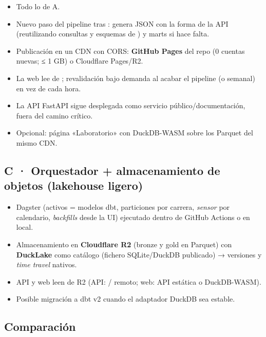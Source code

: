 \begin{itemize}
\item Todo lo de A.
\item Nuevo paso del pipeline tras :  genera JSON con la forma de la API (reutilizando consultas y esquemas de ) y marts  si hace falta.
\item Publicación en un CDN con CORS: \textbf{GitHub Pages} del repo (0 cuentas nuevas; ≤ 1 GB) o Cloudflare Pages/R2.
\item La web lee de ; revalidación bajo demanda al acabar el pipeline (o  semanal) en vez de cada hora.
\item La API FastAPI sigue desplegada como servicio público/documentación, fuera del camino crítico.
\item Opcional: página «Laboratorio» con DuckDB-WASM sobre los Parquet del mismo CDN.
\end{itemize}

\subsection{C · Orquestador + almacenamiento de objetos (lakehouse ligero)}

\begin{itemize}
\item Dagster (activos = modelos dbt, particiones por carrera, \emph{sensor} por calendario, \emph{backfills} desde la UI) ejecutado dentro de GitHub Actions o en local.
\item Almacenamiento en \textbf{Cloudflare R2} (bronze y gold en Parquet) con \textbf{DuckLake} como catálogo (fichero SQLite/DuckDB publicado) → versiones y \emph{time travel} nativos.
\item API y web leen de R2 (API: / remoto; web: API estática o DuckDB-WASM).
\item Posible migración a dbt v2 cuando el adaptador DuckDB sea estable.
\end{itemize}

\subsection{Comparación}

